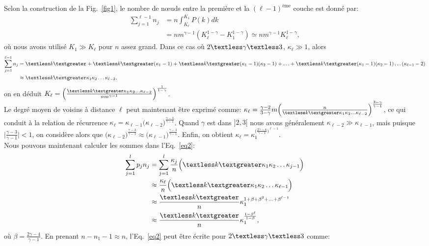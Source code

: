 Selon la construction de la Fig.~\ref{fig1}, le nombre de nœuds entre la première et la $(\ell-1)^{\text{ème}}$ couche est donné par:
\begin{align}
\sum_{j=1}^{\ell-1}n_j&=n\int_{K_{\ell}}^{K_1} P(k)dk \nonumber \\
&=nm^{\gamma-1}(K_{\ell}^{1-\gamma}-K_1^{1-\gamma})\simeq nm^{\gamma-1} K_{\ell}^{1-\gamma},
\label{eq5}
\end{align}
où nous avons utilisé $K_1\gg K_{\ell}$ pour $n$ assez grand. Dans ce cas où $2\textless \gamma \textless 3$, $\kappa_{\ell}\gg 1$, alors
\begin{align}
\sum_{j=1}^{\ell-1}n_j&=\km+\km(\kappa_1-1)+\km(\kappa_1-1)(\kappa_2-1)+\ldots+\km(\kappa_1-1)(\kappa_2-1)\ldots(\kappa_{\ell-1}-2)\nonumber \\
&\approx\km\kappa_1\kappa_2\ldots\kappa_{\ell-2},
\label{eq6}
\end{align}
on en déduit
$K_{\ell}=\Big(\frac{\km\kappa_1\kappa_2\ldots\kappa_{\ell-2}}{nm^{\gamma-1}}\Big)^{\frac{1}{1-\gamma}}$.\\
Le degré moyen de voisins à distance $\ell $ peut maintenant être exprimé comme: 
$\kappa_{\ell}=\frac{\gamma-2}{3-\gamma}m\Big(\frac{n}{\km\kappa_1\kappa_2\ldots\kappa_{\ell-2}}\Big)^{\frac{3-\gamma}{\gamma-1}}$, ce qui conduit à la relation de récurrence $\kappa_{\ell}=\kappa_{\ell-1}
\Big(\kappa_{\ell-2}\Big)^{\frac{\gamma-3}{\gamma-1}}$.  Quand $\gamma$ est dans $]2,3[$ nous avons généralement
$\kappa_{\ell-2} \gg \kappa_{\ell-1}$,  mais puisque $\mid\frac{\gamma-3}{\gamma-1}\mid<1$, on considère alors que $\Big(\kappa_{\ell-2}\Big)^{\frac{\gamma-3}{\gamma-1}}\approx
\Big(\kappa_{\ell-1}\Big)^{\frac{\gamma-3}{\gamma-1}}$. Enfin, on obtient $\kappa_{\ell}=\kappa_1^{\Big(\frac{2\gamma-4}{\gamma-1}\Big)^{\ell-1}}$.\\
Nous pouvons maintenant calculer les sommes dans l'Eq.~\eqref{eq2}:
\begin{align}
\sum_{j=1}^{l} p_jn_j&=\sum_{j=1}^{l}\frac{\kappa_j}{n}\Big(\km\kappa_1\kappa_2\ldots\kappa_{j-1}\Big) \nonumber\\ 
&\approx \frac{\kappa_{\ell}}{n}\Big(\km\kappa_1\kappa_2\ldots\kappa_{\ell-1}\Big) \nonumber \\
&\approx \frac{\km}{n}\kappa_1^{1+\beta+\beta^2+\ldots+\beta^{\ell-1}} \nonumber \\
&\approx \frac{\km}{n}\kappa_1^{\frac{1-\beta^{\ell}}{1-\beta}},
\label{eq7}
\end{align}
où $\beta=\frac{2\gamma-4}{\gamma-1}$. En prenant $n-n_1-1 \approx n$, l'Eq.~\eqref{eq2} peut être écrite pour $2\textless \gamma \textless 3$ comme:
